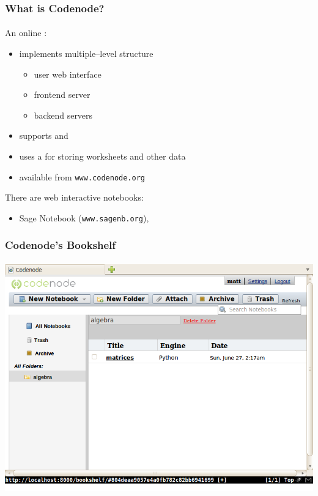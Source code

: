 \documentclass{beamer}
\begin{document}
\begin{frame}
    \frametitle{What is Codenode?}
    \framesubtitle{}

    An  online :
    \begin{itemize}
        \pause
        \item implements multiple--level structure
            \begin{itemize}
                \pause
                \item user web interface
                \pause
                \item frontend server
                \pause
                \item backend servers
            \end{itemize}
        \pause
        \item supports  and 
        \pause
        \item uses a  for storing worksheets and other data
        \pause
        \item available from \texttt{www.codenode.org}
    \end{itemize}
    \pause
    There are  web interactive notebooks:
    \begin{itemize}
        \pause
        \item Sage Notebook (\texttt{www.sagenb.org}), \structure{\ldots}
    \end{itemize}
\end{frame}

\begin{frame}
    \frametitle{Codenode's Bookshelf}
    \framesubtitle{}

    \begin{center}
        \includegraphics[scale=0.45]{images/codenode-bookshelf.png}
    \end{center}
\end{frame}
\end{document}
